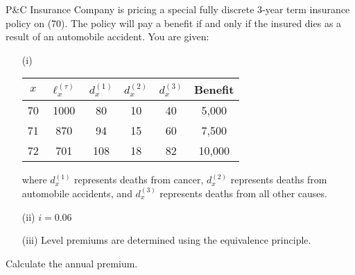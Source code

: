 P\&C Insurance Company is pricing a special fully discrete 3-year term insurance policy on (70). 
The policy will pay a benefit if and only if the insured dies as a result of an automobile accident.
You are given:
\begin{itemize}
\item[(i)] \ 
  \begin{center}\begin{tabular}{c|ccccc} $x$ & $\ell_x^{(\tau)}$ & $d_x^{(1)}$  & $d_x^{(2)}$  & $d_x^{(3)}$ & Benefit \\ \hline
     70 &  1000 &  80 & 10 & 40 & 5,000 \\ 
     71 & 870    &  94 & 15 & 60 & 7,500 \\ 
     72 & 701   & 108 & 18 & 82 & 10,000      \end{tabular}\end{center}
  where $d_x^{(1)}$  represents deaths from cancer, $d_x^{(2)}$  represents deaths from automobile accidents, and $d_x^{(3)}$
  represents deaths from all other causes.
\item[(ii)] $i=0.06$
\item[(iii)] Level premiums are determined using the equivalence principle.
\end{itemize}
Calculate the annual premium.
   
